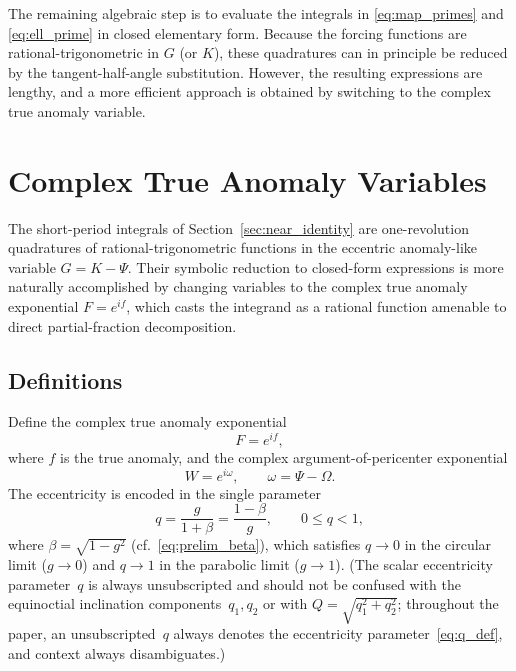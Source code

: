 \documentclass[11pt]{article}
\begin{document}
The remaining algebraic step is to evaluate the integrals in
\eqref{eq:map_primes} and \eqref{eq:ell_prime} in closed elementary form.
Because the forcing functions are rational-trigonometric in $G$ (or $K$),
these quadratures can in principle be reduced by the tangent-half-angle
substitution. However, the resulting expressions are lengthy, and a more
efficient approach is obtained by switching to the complex true anomaly
variable.

\section{Complex True Anomaly Variables}
\label{sec:complex_tav}

The short-period integrals of Section~\ref{sec:near_identity} are
one-revolution quadratures of rational-trigonometric functions in the
eccentric anomaly-like variable $G = K - \Psi$. Their symbolic reduction to
closed-form expressions is more naturally accomplished by changing variables
to the complex true anomaly exponential $F = e^{if}$, which casts the
integrand as a rational function amenable to direct partial-fraction
decomposition.

\subsection{Definitions}

Define the complex true anomaly exponential
\begin{equation}
F = e^{if},
\label{eq:F_def}
\end{equation}
where $f$ is the true anomaly, and the complex argument-of-pericenter
exponential
\begin{equation}
W = e^{i\omega}, \qquad \omega = \Psi - \Omega.
\label{eq:W_def}
\end{equation}
The eccentricity is encoded in the single parameter
\begin{equation}
q = \frac{g}{1+\beta} = \frac{1-\beta}{g},
\qquad 0 \le q < 1,
\label{eq:q_def}
\end{equation}
where $\beta = \sqrt{1 - g^2}$ (cf.\ \eqref{eq:prelim_beta}),
which satisfies $q \to 0$ in the circular limit ($g \to 0$) and $q \to 1$ in
the parabolic limit ($g \to 1$). (The scalar eccentricity parameter~$q$ is always unsubscripted and should
not be confused with the equinoctial inclination components~$q_1, q_2$ or
with $Q = \sqrt{q_1^2+q_2^2}$; throughout the paper, an unsubscripted~$q$
always denotes the eccentricity parameter~\eqref{eq:q_def}, and context
always disambiguates.)
\end{document}
